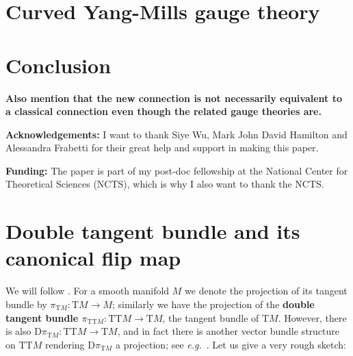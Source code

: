\documentclass[a4paper,oneside,11pt,bibliography=totoc]{scrartcl}
\renewcommand{\theequation}{\arabic{equation}}
\renewcommand{\listoffigures}{\begingroup
\tocsection
\tocfile{\listfigurename}{lof}
\endgroup}
\renewcommand{\listoftables}{\begingroup
\tocsection
\tocfile{\listtablename}{lot}
\endgroup}
\theoremstyle{plain}
\theoremstyle{remark}
\theoremstyle{definition}
\begin{document}
\section{Curved Yang-Mills gauge theory}

\section{Conclusion}

\textbf{Also mention that the new connection is not necessarily equivalent to a classical connection even though the related gauge theories are.}

\textbf{Acknowledgements:} I want to thank Siye Wu, Mark John David Hamilton and Alessandra Frabetti for their great help and support in making this paper.

\textbf{Funding:} The paper is part of my post-doc fellowship at the National Center for Theoretical Sciences (NCTS), which is why I also want to thank the NCTS.





\appendix
\setcounter{equation}{0}
\renewcommand{\theequation}{\Alph{section}.\arabic{equation}} %

\renewcommand\refname{List of References}






\section{Double tangent bundle and its canonical flip map}\label{DoubleTangentFlip}

We will follow \cite[\S 9.6, page 363]{mackenzieGeneralTheory}. For a smooth manifold $M$ we denote the projection of its tangent bundle by $\pi_{\mathrm{T}M}: \mathrm{T}M \to M$; similarly we have the projection of the \textbf{double tangent bundle $\pi_{\mathrm{TT}M}: \mathrm{TT}M \to \mathrm{T}M$}, the tangent bundle of $\mathrm{T}M$. However, there is also $\mathrm{D}\pi_{\mathrm{T}M}: \mathrm{TT}M \to \mathrm{T}M$, and in fact there is another vector bundle structure on $\mathrm{TT}M$ rendering $\mathrm{D}\pi_{\mathrm{T}M}$ a projection; see \textit{e.g.}\ \cite[\S 3.4 \textit{et seq.}; page 110ff.]{mackenzieGeneralTheory}. Let us give a very rough sketch:
\end{document}
